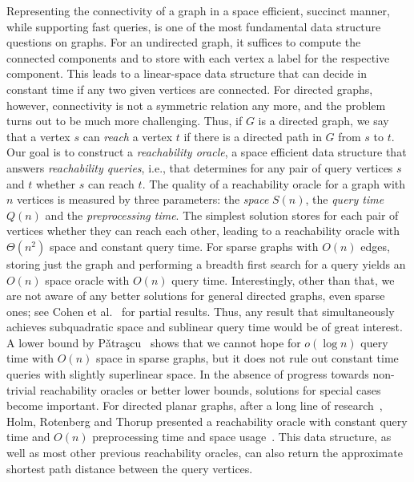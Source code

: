 \documentclass[11pt,a4paper]{paper}
\begin{document}
Representing the connectivity of a graph in a space efficient, 
succinct manner, while supporting fast queries, is
one of the most fundamental data structure questions on graphs.
For an undirected graph,
it suffices to compute the connected components and
to store with each vertex a label for the respective component.
This leads to a linear-space data
structure that can  decide in constant time if any two given vertices are
connected. For directed graphs, however, connectivity is not a 
symmetric relation any more,
and the problem turns out to be much more challenging.
Thus, if $G$ is a directed graph, we say that a vertex $s$ can 
\emph{reach} a vertex $t$ if there is a directed path in $G$
from $s$ to $t$. Our goal is to construct a \emph{reachability oracle},
a space efficient data structure  that answers
\emph{reachability queries}, i.e., that determines for any pair of
query vertices $s$ and $t$ whether $s$ can reach $t$. The quality of a
reachability oracle for a graph with $n$ vertices is measured by three
parameters: the \emph{space} $S(n)$, the \emph{query time} $Q(n)$ and the
\emph{preprocessing time}.  The simplest solution stores for
each pair of vertices whether they can reach each other, leading to a
reachability oracle with $\Theta(n^2)$ space and constant query time.
For sparse graphs with $O(n)$ edges, storing just the graph and 
performing a breadth first search for a query yields an $O(n)$ space 
oracle with $O(n)$ query time.
Interestingly, other than that, we are not aware of any better solutions
for general directed graphs,
even sparse ones; see Cohen et al.~\cite{CohenHaKaZw03} for 
partial results. Thus, any result that
simultaneously achieves subquadratic space and sublinear query time would be of
great interest. A lower bound by P\v{a}tra\c{s}cu~\cite{Patrascu11} shows
that we cannot hope for $o(\log n)$ query time with $O(n)$ space in sparse 
graphs,
but it does not rule out constant time queries with slightly superlinear space.
In the absence of progress towards
non-trivial reachability oracles or better lower bounds, solutions for special
cases become important.
For directed planar graphs, after a long line of 
research~\cite{ArikatiEtAl96,Frederickson87,Djidjev96,ChenXu00,Thorup04},
Holm, Rotenberg and Thorup presented a reachability oracle with 
constant query time and $O(n)$ preprocessing time and space 
usage~\cite{Holm2015}. This data structure, as well as most other 
previous  reachability oracles,  can also return the approximate 
shortest path distance between the query vertices.
\end{document}
